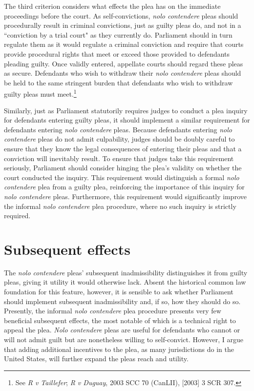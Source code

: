 The third criterion considers what effects the plea has on the immediate proceedings before the court. As self-convictions, \textit{nolo contendere} pleas should procedurally result in criminal convictions, just as guilty pleas do, and not in a ``conviction by a trial court" as they currently do. Parliament should in turn regulate them as it would regulate a criminal conviction and require that courts provide procedural rights that meet or exceed those provided to defendants pleading guilty. Once validly entered, appellate courts should regard these pleas as secure. Defendants who wish to withdraw their \textit{nolo contendere} pleas should be held to the same stringent burden that defendants who wish to withdraw guilty pleas must meet.\footnote{See \textit{R v Taillefer}; \textit{R v Duguay}, 2003 SCC 70 (CanLII), [2003] 3 SCR 307.}

Similarly, just as Parliament statutorily requires judges to conduct a plea inquiry for defendants entering guilty pleas, it should implement a similar requirement for defendants entering \textit{nolo contendere} pleas. Because defendants entering \textit{nolo contendere} pleas do not admit culpability, judges should be doubly careful to ensure that they know the legal consequences of entering their pleas and that a conviction will inevitably result. To ensure that judges take this requirement seriously, Parliament should consider hinging the plea's validity on whether the court conducted the inquiry. This requirement would distinguish a formal \textit{nolo contendere} plea from a guilty plea, reinforcing the importance of this inquiry for \textit{nolo contendere} pleas. Furthermore, this requirement would significantly improve the informal \textit{nolo contendere} plea procedure, where no such inquiry is strictly required.

\section{Subsequent effects}

The \textit{nolo contendere} pleas' subsequent inadmissibility distinguishes it from guilty pleas, giving it utility it would otherwise lack. Absent the historical common law foundation for this feature, however, it is sensible to ask whether Parliament should implement subsequent inadmissibility and, if so, how they should do so. Presently, the informal \textit{nolo contendere} plea procedure presents very few beneficial subsequent effects, the most notable of which is a technical right to appeal the plea. \textit{Nolo contendere} pleas are useful for defendants who cannot or will not admit guilt but are nonetheless willing to self-convict. However, I argue that adding additional incentives to the plea, as many jurisdictions do in the United States, will further expand the pleas reach and utility. 

